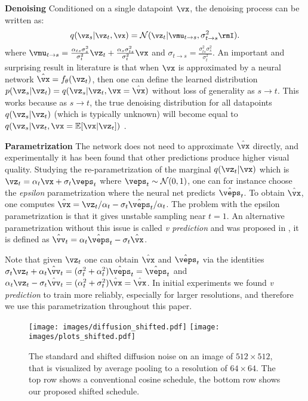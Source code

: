 \textbf{Denoising}
Conditioned on a single datapoint $\vx$, the denoising process can be written as:
\begin{equation}\small
    q(\vz_s | \vz_t, \vx) = \mathcal{N}(\vz_t | \vmu_{t \to s}, \sigma_{t \to s}^2 \rmI).
\end{equation}
where $\vmu_{t \to s} = \frac{\alpha_{ts} \sigma_s^2}{\sigma_t^2} \vz_t + \frac{\alpha_s \sigma_{ts}^2}{\sigma_t^2} \vx$ and $ \sigma_{t \to s} = \frac{\sigma_{ts}^2 \sigma_{s}^2}{\sigma_t^2}$. An important and surprising result in literature is that when $\vx$ is approximated by a neural network $\hat{\vx} = f_\theta(\vz_t)$, then one can define the learned distribution $p(\vz_s | \vz_t) = q(\vz_s | \vz_t, \vx = \hat{\vx})$ without loss of generality as $s \to t$. This works because as $s \to t$, the true denoising distribution for all datapoints $q(\vz_s | \vz_t)$ (which is typically unknown) will become equal to $q(\vz_s | \vz_t, \vx = \mathbb{E}[\vx | \vz_t])$ \citep{song2021scorebasedsde}.

\textbf{Parametrization}
The network does not need to approximate $\hat{\vx}$ directly, and experimentally it has been found that other predictions produce higher visual quality. Studying the re-parametrization of the marginal $q(\vz_t | \vx)$ which is $\vz_t = \alpha_t \vx + \sigma_t \veps_t$ where $\veps_t \sim \mathcal{N}(0, 1)$, one can for instance choose the \textit{epsilon} parametrization where the neural net predicts $\hat{\veps}_t$. To obtain $\hat{\vx}$, one computes $\hat{\vx} = \vz_t / \alpha_t - \sigma_t \hat{\veps}_t / \alpha_t$. The problem with the epsilon parametrization is that it gives unstable sampling near $t = 1$. An alternative parametrization without this issue is called \textit{v prediction} and was proposed in \citep{salimans2022progressive}, it is defined as $\hat{\vv}_t = \alpha_t \hat{\veps}_t - \sigma_t \hat{\vx}$.

Note that given $\vz_t$ one can obtain $\hat{\vx}$ and $\hat{\veps}_t$ via the identities $\sigma_t \vz_t + \alpha_t \hat{\vv}_t = (\sigma_t^2 + \alpha_t^2) \hat{\veps}_t = \hat{\veps}_t $ and  $\alpha_t \vz_t - \sigma_t \hat{\vv}_t = (\alpha_t^2 + \sigma_t^2) \hat{\vx} = \hat{\vx}$. In initial experiments we found \textit{v prediction} to train more reliably, especially for larger resolutions, and therefore we use this parametrization throughout this paper.

\begin{figure*}
    \centering
    \texttt{[image: images/diffusion\_shifted.pdf]}
    \texttt{[image: images/plots\_shifted.pdf]}
    \vspace{-.2cm}
    \caption{The standard and shifted diffusion noise on an image of $512 \times 512$, that is visualized by average pooling to a resolution of $64 \times 64$. The top row shows a conventional cosine schedule, the bottom row shows our proposed shifted schedule.}
    \label{fig:diffusion_shifted}
\end{figure*}

